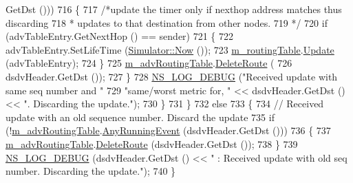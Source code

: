\begin{DoxyCode}
      GetDst ()))
716                         \{
717                           \textcolor{comment}{/*update the timer only if nexthop address matches thus discarding}
718 \textcolor{comment}{                           * updates to that destination from other nodes.}
719 \textcolor{comment}{                           */}
720                           \textcolor{keywordflow}{if} (advTableEntry.GetNextHop () == sender)
721                             \{
722                               advTableEntry.SetLifeTime (\hyperlink{classns3_1_1Simulator_ac3178fa975b419f7875e7105be122800}{Simulator::Now} ());
723                               \hyperlink{classns3_1_1dsdv_1_1RoutingProtocol_acc4cee466c2591e35f508ce58097a00e}{m\_routingTable}.\hyperlink{classns3_1_1dsdv_1_1RoutingTable_a651762730975f809c720313b1332cb99}{Update} (advTableEntry);
724                             \}
725                           \hyperlink{classns3_1_1dsdv_1_1RoutingProtocol_adce3cf63777d6099e58caa1cb198282c}{m\_advRoutingTable}.\hyperlink{classns3_1_1dsdv_1_1RoutingTable_a384f271a1393c513c4ae7ba4476c3e08}{DeleteRoute} (
726                             dsdvHeader.GetDst ());
727                         \}
728                       \hyperlink{group__logging_ga413f1886406d49f59a6a0a89b77b4d0a}{NS\_LOG\_DEBUG} (\textcolor{stringliteral}{"Received update with same seq number and "}
729                                     \textcolor{stringliteral}{"same/worst metric for, "} << dsdvHeader.GetDst () << \textcolor{stringliteral}{". Discarding the
       update."});
730                     \}
731                 \}
732               \textcolor{keywordflow}{else}
733                 \{
734                   \textcolor{comment}{// Received update with an old sequence number. Discard the update}
735                   \textcolor{keywordflow}{if} (!\hyperlink{classns3_1_1dsdv_1_1RoutingProtocol_adce3cf63777d6099e58caa1cb198282c}{m\_advRoutingTable}.\hyperlink{classns3_1_1dsdv_1_1RoutingTable_acb9f117332351347f8345d4591991e6b}{AnyRunningEvent} (dsdvHeader.GetDst
       ()))
736                     \{
737                       \hyperlink{classns3_1_1dsdv_1_1RoutingProtocol_adce3cf63777d6099e58caa1cb198282c}{m\_advRoutingTable}.\hyperlink{classns3_1_1dsdv_1_1RoutingTable_a384f271a1393c513c4ae7ba4476c3e08}{DeleteRoute} (dsdvHeader.GetDst ());
738                     \}
739                   \hyperlink{group__logging_ga413f1886406d49f59a6a0a89b77b4d0a}{NS\_LOG\_DEBUG} (dsdvHeader.GetDst () << \textcolor{stringliteral}{" : Received update with old seq
       number. Discarding the update."});
740                 \}

\end{DoxyCode}
